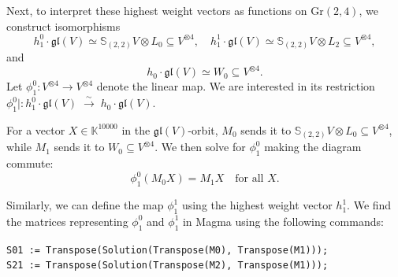 \documentclass{amsart}
\begin{document}

Next, to interpret these highest weight vectors as functions on $\mathrm{Gr}(2,4)$, we construct isomorphisms $$ h_1^0 \cdot \mathfrak{gl}(V) \simeq \mathbb{S}_{(2,2)} V \otimes L_0 \subseteq V^{\otimes 4}, \quad
 h_1^1 \cdot \mathfrak{gl}(V) \simeq \mathbb{S}_{(2,2)} V \otimes L_2 \subseteq V^{\otimes 4},$$
and $$h_{0} \cdot \mathfrak{gl}(V) \simeq W_0  \subseteq V^{\otimes 4}.$$  
Let \(\phi_1^0 : V^{\otimes 4} \longrightarrow V^{\otimes 4}\) denote the linear map. We are interested in its restriction 
\(
\phi_1^0| : h_1^0 \cdot \mathfrak{gl}(V)\;\xrightarrow{\sim}\; h_{0} \cdot \mathfrak{gl}(V).
\)

For a vector \(X \in \mathbb{K}^{10000}\) in the \(\mathfrak{gl}(V)\)-orbit, $M_0$ sends it to $\mathbb{S}_{(2,2)} V \otimes L_0 \subseteq V^{\otimes 4}$, while $M_1$ sends it to $W_0 \subseteq V^{\otimes 4}$. We then solve for \(\phi_1^0\) making the diagram commute:
\begin{equation*}
\phi_1^0 (M_0 X) = M_1 X \quad \text{for all } X.
\end{equation*}

\begin{figure}[h!]
\centering
{}
\end{figure}

Similarly, we can define the map \(\phi_1^1\) using the highest weight vector \(h_1^1\). We find the matrices representing \(\phi_1^0\) and \(\phi_1^1\) in Magma using the following commands:
\begin{flushleft}
\texttt{S01 := Transpose(Solution(Transpose(M0), Transpose(M1)));}
\\
\texttt{S21 := Transpose(Solution(Transpose(M2), Transpose(M1)));} 
\end{flushleft}
\end{document}
